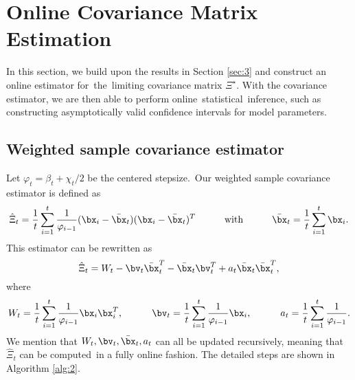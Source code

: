 
\section{Online Covariance Matrix Estimation}\label{sec:4}

In this section, we build upon the results in Section \ref{sec:3} and construct an online estimator for~the~limiting covariance matrix $\Xi^\star$. With the covariance estimator, we are then able to perform online~\mbox{statistical}~inference, such as constructing asymptotically valid confidence intervals for model parameters. 


\subsection{Weighted sample covariance estimator}\label{sec:4.1}

Let $\varphi_t = \beta_t + \chi_t/2$ be the centered stepsize.~Our weighted sample covariance estimator is defined as$\;\;$ 
\begin{equation}\label{exp:Xihat}
\hat{\Xi}_t = \frac{1}{t}\sum_{i=1}^t \frac{1}{\varphi_{i-1}}(\bx_i-\bar{\bx}_t)(\bx_i-\bar{\bx}_t)^T\quad\quad\quad\text{with}\quad\quad\quad
\bar{\bx}_t = \frac{1}{t}\sum_{i=1}^t\bx_i.
\end{equation}
This estimator can be rewritten as
\begin{equation*}
\hat{\Xi}_t = W_t - \bv_t\bar{\bx}_t^T - \bar{\bx}_t\bv_t^T + a_t\bar{\bx}_t\bar{\bx}_t^T,
\end{equation*}
where
\begin{equation}\label{nequ:9}
W_t = \frac{1}{t}\sum_{i=1}^t \frac{1}{\varphi_{i-1}}\bx_i\bx_i^T,\quad \quad\quad\bv_t = \frac{1}{t}\sum_{i=1}^t \frac{1}{\varphi_{i-1}}\bx_i,\quad\quad\quad a_t = \frac{1}{t}\sum_{i=1}^t\frac{1}{\varphi_{i-1}}.
\end{equation}
We mention that $W_t, \bv_t, \bar{\bx}_t, a_t$ can all be updated recursively, meaning that $\hat{\Xi}_t$ can be computed~in a fully online fashion. The detailed steps are shown in Algorithm \ref{alg:2}.

